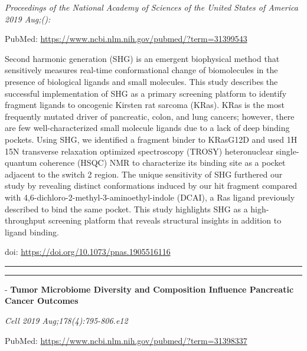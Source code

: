 \documentclass[]{article}
\begin{document}
\emph{Proceedings of the National Academy of Sciences of the United
States of America 2019 Aug;():}

PubMed: \url{https://www.ncbi.nlm.nih.gov/pubmed/?term=31399543}

Second harmonic generation (SHG) is an emergent biophysical method that
sensitively measures real-time conformational change of biomolecules in
the presence of biological ligands and small molecules. This study
describes the successful implementation of SHG as a primary screening
platform to identify fragment ligands to oncogenic Kirsten rat sarcoma
(KRas). KRas is the most frequently mutated driver of pancreatic, colon,
and lung cancers; however, there are few well-characterized small
molecule ligands due to a lack of deep binding pockets. Using SHG, we
identified a fragment binder to KRasG12D and used 1H 15N transverse
relaxation optimized spectroscopy (TROSY) heteronuclear single-quantum
coherence (HSQC) NMR to characterize its binding site as a pocket
adjacent to the switch 2 region. The unique sensitivity of SHG furthered
our study by revealing distinct conformations induced by our hit
fragment compared with 4,6-dichloro-2-methyl-3-aminoethyl-indole (DCAI),
a Ras ligand previously described to bind the same pocket. This study
highlights SHG as a high-throughput screening platform that reveals
structural insights in addition to ligand binding.

doi: \url{https://doi.org/10.1073/pnas.1905516116}

{}

{}

\begin{center}\rule{0.5\linewidth}{\linethickness}\end{center}

\begin{center}\rule{0.5\linewidth}{\linethickness}\end{center}

 - \textbf{Tumor Microbiome Diversity and Composition Influence
Pancreatic Cancer Outcomes}

\emph{Cell 2019 Aug;178(4):795-806.e12}

PubMed: \url{https://www.ncbi.nlm.nih.gov/pubmed/?term=31398337}
\end{document}
